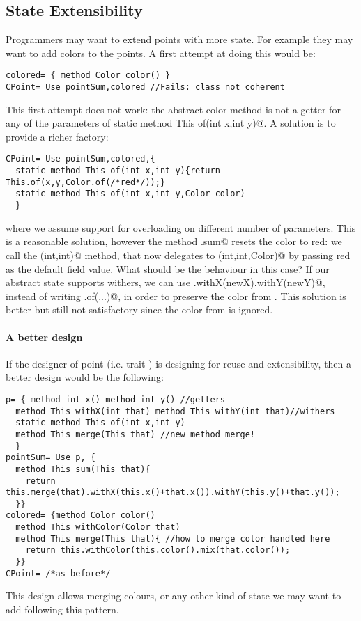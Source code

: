 \subsection{State Extensibility}
Programmers may want to extend points with more state. For example 
they may want to add colors to the points. A first attempt at doing
this would be:
\saveSpace
\begin{lstlisting}
colored= { method Color color() }
CPoint= Use pointSum,colored //Fails: class not coherent
\end{lstlisting}
\saveSpace
This first attempt does not work: the abstract color method
is not a getter for any of the parameters of 
\Q@ static method This of(int x,int y)@. 
A solution is to provide a richer factory:
\saveSpace
\begin{lstlisting}
CPoint= Use pointSum,colored,{
  static method This of(int x,int y){return This.of(x,y,Color.of(/*red*/));}
  static method This of(int x,int y,Color color)
  }
\end{lstlisting}
\saveSpace
\noindent 
where we assume support for overloading on different number of parameters.
This is a reasonable solution, however the method \Q@CPoint.sum@ resets
the color to red: we call the \Q@of(int,int)@ method, that now
delegates to \Q@of(int,int,Color)@ by passing red as the default field
value.  What should be the behaviour in this case?  If our abstract
state supports withers, we can use
\Q@this.withX(newX).withY(newY)@, instead of writing \Q@This.of(...)@, in order to preserve the color from
\Q@this@.  This solution is better but still not satisfactory since the color from \Q@that@ is ignored.

\paragraph{A better design}
If the designer of point (i.e. trait \Q@p@) is designing for reuse and extensibility, then 
a better design would be the following:  
\saveSpace\begin{lstlisting}
p= { method int x() method int y() //getters
  method This withX(int that) method This withY(int that)//withers
  static method This of(int x,int y)
  method This merge(This that) //new method merge!
  }
pointSum= Use p, { 
  method This sum(This that){
    return this.merge(that).withX(this.x()+that.x()).withY(this.y()+that.y());
  }}
colored= {method Color color()
  method This withColor(Color that)
  method This merge(This that){ //how to merge color handled here
    return this.withColor(this.color().mix(that.color());
  }}
CPoint= /*as before*/
\end{lstlisting}  \saveSpace
  \noindent This design allows merging colours, or any other kind of state we may want to add
  following this pattern.%

